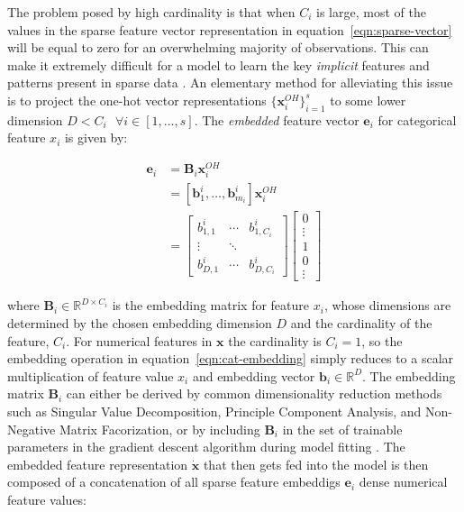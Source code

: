 \documentclass{mldsmsc}
\begin{document}
The problem posed by high cardinality is that when $C_i$ is large, most of the values
in the sparse feature vector representation in equation~\ref{eqn:sparse-vector}
will be equal to zero for an overwhelming majority of observations. This can make it extremely difficult
for a model to learn the key \emph{implicit} features and patterns present in sparse
data \citep{RefWorks:gu2021ad}. An elementary method for alleviating this issue is to project
the one-hot vector representations $\{ \mathbf{x}_i^{OH}\}_{i=1}^{s}$ to some lower dimension
$D < C_i \text{ } \forall i \in [1, \ldots, s]$. The \emph{embedded} feature vector
$\mathbf{e}_i$ for categorical feature $x_i$ is given by:

\begin{equation}
\label{eqn:cat-embedding}
\begin{split}
\mathbf{e}_i &= \mathbf{B}_i \mathbf{x}_i^{OH}\\
&= \left[\mathbf{b}_{1}^{i}, \ldots, \mathbf{b}_{m_i}^{i} \right] \mathbf{x}_i^{OH} \\
&= \begin{bmatrix}
b_{1,1}^i & \cdots & b_{1 ,C_i}^i\\
\vdots & \ddots & \\
b_{D, 1}^i & \cdots & b_{D, C_i}^i
\end{bmatrix}
\begin{bmatrix}
    0 \\
    \vdots \\
    1 \\
    0\\
    \vdots
\end{bmatrix}
\end{split}
\end{equation}

where $\mathbf{B}_i \in \mathbb{R}^{D \times C_i}$ is the embedding matrix for feature $x_i$, whose dimensions are determined
by the chosen embedding dimension $D$ and the cardinality of the feature, $C_i$. For numerical features
in $\mathbf{x}$ the cardinality is $C_i = 1$, so the embedding operation in equation~\ref{eqn:cat-embedding}
simply reduces to a scalar multiplication of feature value $x_i$ and embedding vector $\mathbf{b}_i \in \mathbb{R}^{D}$.
The embedding matrix $\mathbf{B}_i$ can either be derived by common dimensionality
reduction methods such as Singular Value Decomposition, Principle Component Analysis, and Non-Negative Matrix Facorization,
or by including $\mathbf{B}_i$ in the set of trainable parameters in the gradient descent
algorithm during model fitting \citep{RefWorks:hancock2020survey}. The embedded feature representation
$\dot{\mathbf{x}}$ that then gets fed into the model is 
then composed of a concatenation of all sparse feature embeddigs $\mathbf{e}_i$ dense 
numerical feature values:
\end{document}
